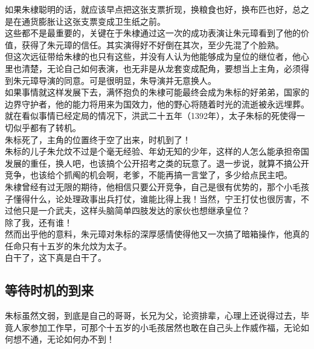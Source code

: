 \begin{multicols}{\theparacolNo}
如果朱棣聪明的话，就应该早点把这张支票折现，换粮食也好，换布匹也好，总之是在通货膨胀让这张支票变成卫生纸之前。\\

这些都不是最重要的，关键在于朱棣通过这一次的成功表演让朱元璋看到了他的价值，获得了朱元璋的信任。其实演得好不好倒在其次，至少先混了个脸熟。\\

但这次远征带给朱棣的也只有这些，并没有人认为他能够成为皇位的继位者，他心里也清楚，无论自己如何表演，也无非是从龙套变成配角，要想当上主角，必须得到朱元璋导演的同意。可是很明显，朱导演并无意换人。\\

如果事情就这样发展下去，满怀抱负的朱棣可能最终会成为朱标的好弟弟，国家的边界守护者，他的能力将用来为国效力，他的野心将随着时光的流逝被永远埋葬。\\

就在看似事情已经定局的情况下，洪武二十五年（1392年），太子朱标的死使得一切似乎都有了转机。\\

朱标死了，主角的位置终于空了出来，时机到了！\\

朱标的儿子朱允炆不过是个毫无经验、年幼无知的少年，这样的人怎么能承担帝国发展的重任，换人吧，也该搞个公开招考之类的玩意了。退一步说，就算不搞公开竞争，也该给个抓阄的机会啊，老爹，不能再搞一言堂了，多少给点民主吧。\\

朱棣曾经有过无限的期待，他相信只要公开竞争，自己是很有优势的，那个小毛孩子懂得什么，论处理政事出兵打仗，谁能比得上我！当然，宁王打仗也很厉害，不过他只是一介武夫，这样头脑简单四肢发达的家伙也想继承皇位？\\

除了我，还有谁！\\

然而出乎他的意料，朱元璋对朱标的深厚感情使得他又一次搞了暗箱操作，他真的任命只有十五岁的朱允炆为太子。\\

白干了，这下真是白干了。\\

\subsection{等待时机的到来}
朱标虽然文弱，到底是自己的哥哥，长兄为父，论资排辈，心理上还说得过去，毕竟人家参加工作早，可那个十五岁的小毛孩居然也敢在自己头上作威作福，无论如何想不通，无论如何办不到！\\


\end{multicols}
